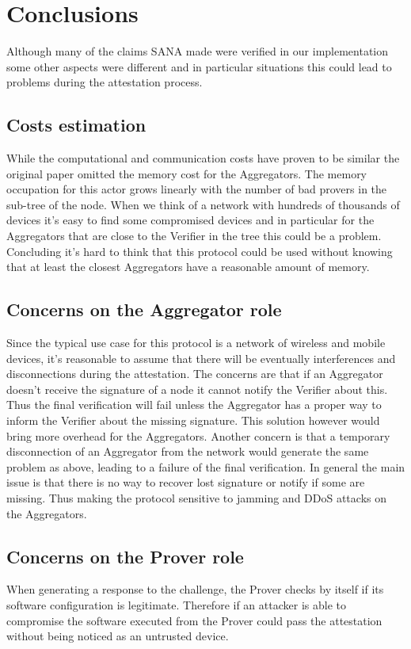 \section{Conclusions}

Although many of the claims SANA made were verified in our implementation some other aspects were different and in particular situations this could lead to problems during the attestation process.
\subsection{Costs estimation}
While the computational and communication costs have proven to be similar the original paper omitted the memory cost for the Aggregators. 
The memory occupation for this actor grows linearly with the number of bad provers in the sub-tree of the node. 
When we think of a network with hundreds of thousands of devices it's easy to find some compromised devices and in particular for the Aggregators that are close to the Verifier in the tree this could be a problem.
Concluding it's hard to think that this protocol could be used without knowing that at least the closest Aggregators have a reasonable amount of memory.

\subsection{Concerns on the Aggregator role}
Since the typical use case for this protocol is a network of wireless and mobile devices, it's reasonable to assume that there will be eventually interferences and disconnections during the attestation.
The concerns are that if an Aggregator doesn't receive the signature of a node it cannot notify the Verifier about this. Thus the final verification will fail unless the Aggregator has a proper way to inform the Verifier about the missing signature.
This solution however would bring more overhead for the Aggregators.
Another concern is that a temporary disconnection of an Aggregator from the network would generate the same problem as above, leading to a failure of the final verification.
In general the main issue is that there is no way to recover lost signature or notify if some are missing. Thus making the protocol sensitive to jamming and DDoS attacks on the Aggregators. 

\subsection{Concerns on the Prover role}
When generating a response to the challenge, the Prover checks by itself if its software configuration is legitimate.
Therefore if an attacker is able to compromise the software executed from the Prover could pass the attestation without being noticed as an untrusted device.

